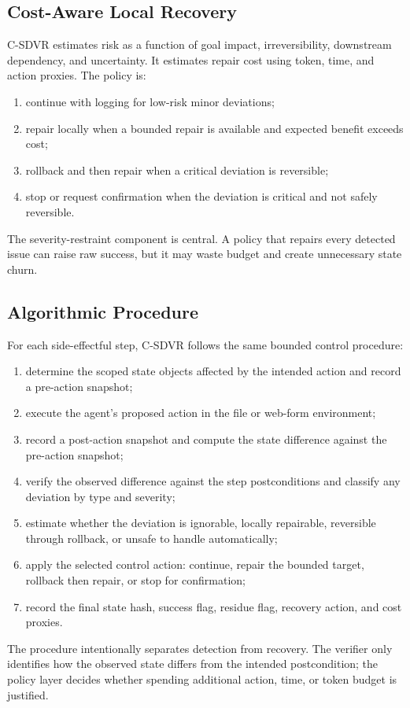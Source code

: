 \documentclass[pdflatex,sn-apa]{sn-jnl}
\begin{document}
\subsection{Cost-Aware Local Recovery}

C-SDVR estimates risk as a function of goal impact, irreversibility, downstream dependency, and uncertainty. It estimates repair cost using token, time, and action proxies. The policy is:
\begin{enumerate}[leftmargin=*]
  \item continue with logging for low-risk minor deviations;
  \item repair locally when a bounded repair is available and expected benefit exceeds cost;
  \item rollback and then repair when a critical deviation is reversible;
  \item stop or request confirmation when the deviation is critical and not safely reversible.
\end{enumerate}
The severity-restraint component is central. A policy that repairs every detected issue can raise raw success, but it may waste budget and create unnecessary state churn.

\subsection{Algorithmic Procedure}

For each side-effectful step, C-SDVR follows the same bounded control procedure:
\begin{enumerate}[leftmargin=*]
  \item determine the scoped state objects affected by the intended action and record a pre-action snapshot;
  \item execute the agent's proposed action in the file or web-form environment;
  \item record a post-action snapshot and compute the state difference against the pre-action snapshot;
  \item verify the observed difference against the step postconditions and classify any deviation by type and severity;
  \item estimate whether the deviation is ignorable, locally repairable, reversible through rollback, or unsafe to handle automatically;
  \item apply the selected control action: continue, repair the bounded target, rollback then repair, or stop for confirmation;
  \item record the final state hash, success flag, residue flag, recovery action, and cost proxies.
\end{enumerate}
The procedure intentionally separates detection from recovery. The verifier only identifies how the observed state differs from the intended postcondition; the policy layer decides whether spending additional action, time, or token budget is justified.
\end{document}
